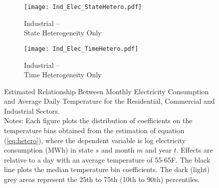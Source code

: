 \documentclass[11pt]{article}
\begin{document}
\begin{figure}
	\begin{subfigure}{0.325\textwidth}
	\centering
	\caption{Industrial -- \\ State Heterogeneity Only}
	\label{fig:ind_hetero_state}
	\texttt{[image: Ind\_Elec\_StateHetero.pdf]}
	\end{subfigure} \hspace{0em}%
	\begin{subfigure}{0.325\textwidth}
	\centering
	\caption{Industrial -- \\ Time Heterogeneity Only}
	\label{fig:ind_hetero_time}
	\texttt{[image: Ind\_Elec\_TimeHetero.pdf]}
	\end{subfigure}
	\caption{Estimated Relationship Between Monthly Electricity Consumption and Average Daily Temperature for the Residential, Commercial and Industrial Sectors. \\ {\small Notes: Each figure plots the distribution of coefficients on the temperature bins obtained from the estimation of equation (\ref{eq:hetero}), where the dependent variable is log electricity consumption (MWh) in state $s$ and month $m$ and year $t$. Effects are relative to a day with an average temperature of 55-65\degree F. The black line plots the median temperature bin coefficients. The dark (light) grey areas represent the 25th to 75th (10th to 90th) percentiles.}}
	\label{fig:electricity_hetero}
\end{figure}
\end{document}

